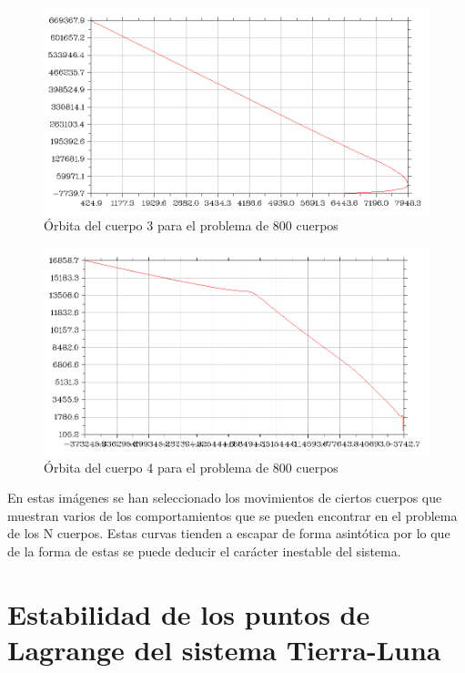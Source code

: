 \documentclass{article}
\begin{document}
	\newpage

	\begin{figure}[h!]
		\begin{center}
			\includegraphics[scale=0.45]{nbodies3.png}
			\caption{Órbita del cuerpo 3 para el problema de 800 cuerpos}
		\end{center}
	\end{figure}

	\begin{figure}[h!]
		\begin{center}
			\includegraphics[scale=0.45]{nbodies4.png}
			\caption{Órbita del cuerpo 4 para el problema de 800 cuerpos}
		\end{center}
	\end{figure}

	En estas imágenes se han seleccionado los movimientos de ciertos cuerpos que muestran varios de los comportamientos que se pueden encontrar en el problema de los N cuerpos. Estas curvas tienden a escapar de forma asintótica por lo que de la forma de estas se puede deducir el carácter inestable del sistema.
	
	\newpage
	
	\section{Estabilidad de los puntos de Lagrange del sistema Tierra-Luna}
	
\end{document}
